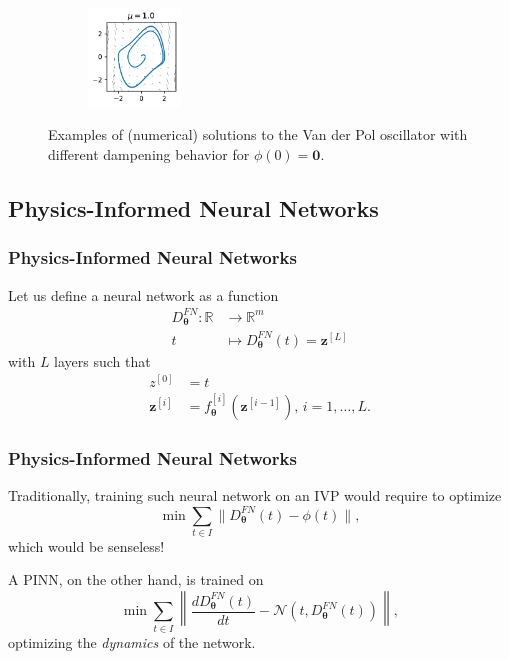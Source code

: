 \documentclass[t]{beamer}
\newcommand{\R}{\mathbb{R}}
\begin{document}
\begin{frame}
\begin{figure}[h]
\begin{subfigure}[b]{\textwidth}
	    \includegraphics[width=0.27\textwidth]{../images/vdp_statespace_mu_10.pdf}
	\end{subfigure}
	\caption{Examples of (numerical) solutions to the Van der Pol oscillator with different dampening behavior for $\phi(0)=\bm{0}$.}\label{fig:vdp_example}
    \end{figure}
\end{frame}

\subsection{Physics-Informed Neural Networks}

\begin{frame}
    \frametitle{Physics-Informed Neural Networks}
    Let us define a neural network as a function
    \begin{align*}
	D^{FN}_{\bm{\theta}}: \R &\longrightarrow \R^{m} \\
	t &\longmapsto 	D^{FN}_{\bm{\theta}}(	t) = \bm{z}^{[L]}
    \end{align*}
    with $L$ layers such that
    \begin{align*}
	z^{[0]} &= t \\
	\bm{z}^{[i]} &= f^{[i]}_{\bm{\theta}}\left( \bm{z}^{[i-1]} \right) ,\,i=1,\ldots,L
    .\end{align*}
\end{frame}

\begin{frame}
    \frametitle{Physics-Informed Neural Networks}
    Traditionally, training such neural network on an IVP would require to optimize \[
    \min \sum_{t\in I} \|D^{FN}_{\bm{\theta}}(t) - \phi(t)\|
    ,\] 
    which would be senseless! \pause

    A PINN\cite{Raissi2019}, on the other hand, is trained on \[
    \min \sum_{t \in I} \left\|  \frac{d D^{FN}_{\bm{\theta}}(t)}{dt} - \mathcal{N}\left( t, D^{FN}_{\bm{\theta}}(t) \right) \right\| 
    ,\] 
    optimizing the \emph{dynamics} of the network.
\end{frame}
\end{document}
